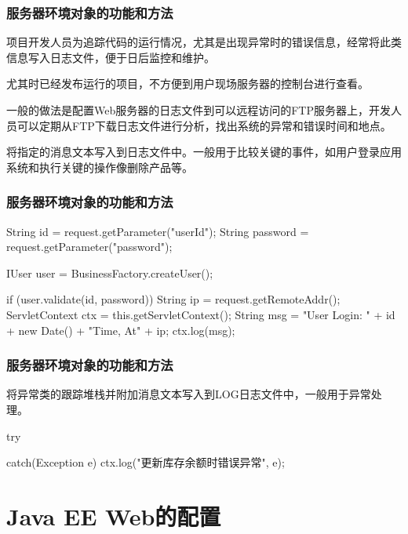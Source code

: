 \begin{frame}[fragile] %
\frametitle{服务器环境对象的功能和方法} 


项目开发人员为追踪代码的运行情况，尤其是出现异常时的错误信息，经常将此类信息写入日志文件，便于日后监控和维护。

尤其时已经发布运行的项目，不方便到用户现场服务器的控制台进行查看。

一般的做法是配置Web服务器的日志文件到可以远程访问的FTP服务器上，开发人员可以定期从FTP下载日志文件进行分析，找出系统的异常和错误时间和地点。


将指定的消息文本写入到日志文件中。一般用于比较关键的事件，如用户登录应用系统和执行关键的操作像删除产品等。
\end{frame}

\begin{frame}[fragile] %
\frametitle{服务器环境对象的功能和方法} 

\begin{javaCode}
String id = request.getParameter("userId");
String password = request.getParameter("password");

IUser user = BusinessFactory.createUser();

if (user.validate(id, password)) {
  String ip = request.getRemoteAddr();
  ServletContext ctx = this.getServletContext();
  String msg = "User Login: " + id + new Date() + "Time, At" + ip;
  ctx.log(msg);
}
\end{javaCode}
\end{frame}

\begin{frame}[fragile] %
\frametitle{服务器环境对象的功能和方法} 


将异常类的跟踪堆栈并附加消息文本写入到LOG日志文件中，一般用于异常处理。

\begin{javaCode}
try {

}  catch(Exception e) {
  ctx.log("更新库存余额时错误异常", e);
}
\end{javaCode}
\end{frame}

\section{Java EE Web的配置}


